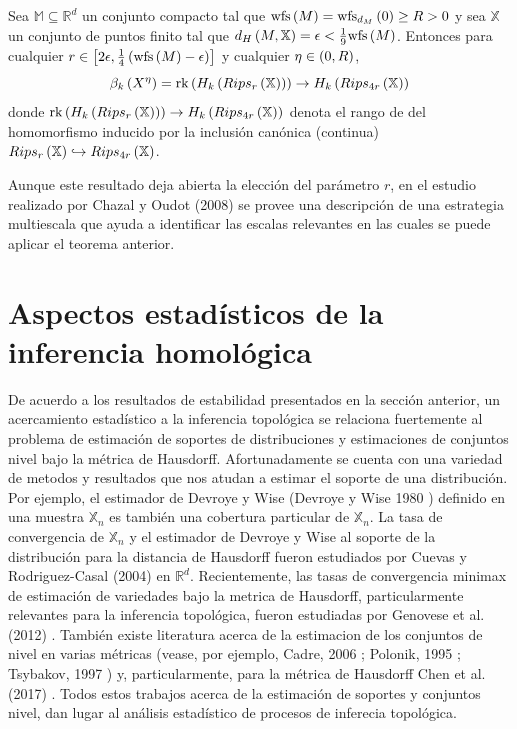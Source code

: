 \begin{teorema}
    Sea $\mathbb{M}\subseteq\mathbb{R}^{d}$ un conjunto compacto tal que $\mathrm{wfs}\left(M\right)=
    \mathrm{wfs}_{d_{M}}\left(0\right)\geq R>0$ y sea $\mathbb{X}$ un conjunto de puntos finito tal que
    $d_{H}\left(M,\mathbb{X}\right)=\epsilon <\frac{1}{9}\mathrm{wfs}\left(M\right)$. Entonces para cualquier
    $r\in \left[2\epsilon, \frac{1}{4}\left(\mathrm{wfs}\left(M\right)-\epsilon\right)\right]$ y cualquier
    $\eta\in\left(0,R\right)$,
    \begin{equation*}
        \beta_{k}\left(X^{\eta}\right) = \mathrm{rk}\left(H_{k}\left(Rips_{r}\left(\mathbb{X}\right)\right)\right)
        \rightarrow H_{k}\left(Rips_{4r}\left(\mathbb{X}\right)\right)
    \end{equation*}
    donde $\mathrm{rk}\left(H_{k}\left(Rips_{r}\left(\mathbb{X}\right)\right)\right)
    \rightarrow H_{k}\left(Rips_{4r}\left(\mathbb{X}\right)\right)$ denota el rango de del homomorfismo inducido
    por la inclusi\'on can\'onica (continua)
    $Rips_{r}\left(\mathbb{X}\right)\hookrightarrow Rips_{4r}\left(\mathbb{X}\right)$.
\end{teorema}

Aunque este resultado deja abierta la elecci\'on del par\'ametro $r$, en el estudio realizado por
Chazal y Oudot (2008) \cite{Chazaloudot2008} se provee una descripci\'on de una estrategia multiescala
que ayuda a identificar las escalas relevantes en las cuales se puede aplicar el teorema anterior.

\newpage

\section{Aspectos estad\'isticos de la inferencia homol\'ogica}

De acuerdo a los resultados de estabilidad presentados en la secci\'on anterior, un acercamiento
estad\'istico a la inferencia topol\'ogica se relaciona fuertemente al problema de estimaci\'on de
soportes de distribuciones y estimaciones de conjuntos nivel bajo la m\'etrica de Hausdorff.
Afortunadamente se cuenta con una variedad de metodos y resultados que nos atudan a estimar el soporte de
una distribuci\'on. Por ejemplo, el estimador de Devroye y Wise
(Devroye y Wise 1980 \cite{DevroyeWise1980}) definido en una muestra $\mathbb{X}_{n}$ es tambi\'en una
cobertura  particular de $\mathbb{X}_{n}$. La tasa de convergencia de $\mathbb{X}_{n}$ y el estimador
de Devroye y Wise al soporte de la distribuci\'on para la distancia de Hausdorff fueron estudiados por
Cuevas y Rodriguez-Casal (2004) \cite{CuevasRodriguezCasal2004} en $\mathbb{R}^{d}$. Recientemente, las
tasas de convergencia minimax de estimaci\'on de variedades bajo la metrica de Hausdorff, particularmente
relevantes para la inferencia topol\'ogica, fueron estudiadas por Genovese et al. (2012)
\cite{Genovese2012}. Tambi\'en existe literatura acerca de la estimacion de los conjuntos de nivel en
varias m\'etricas (vease, por ejemplo, Cadre, 2006 \cite{Cadre2006}; Polonik, 1995 \cite{Polonik1995};
Tsybakov, 1997 \cite{Tsybakov1997}) y, particularmente, para la m\'etrica de Hausdorff Chen et al.
(2017) \cite{Chen2017}. Todos estos trabajos acerca de la estimaci\'on de soportes y conjuntos nivel,
dan lugar al an\'alisis estad\'istico de procesos de inferecia topol\'ogica.

